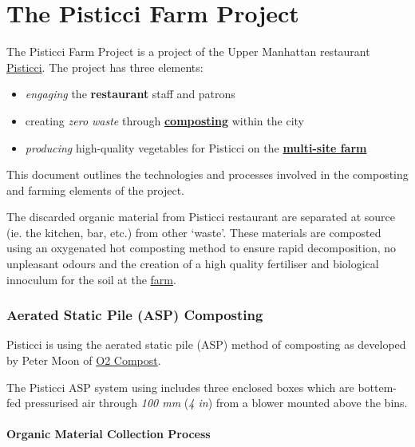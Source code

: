 \section{The Pisticci Farm Project}\label{the-pisticci-farm-project}

The Pisticci Farm Project is a project of the Upper Manhattan restaurant
\href{http://www.pisticcinyc.com/}{Pisticci}. The project has three
elements:

\begin{itemize}
\itemsep1pt\parskip0pt
\item
  \emph{engaging} the \textbf{restaurant} staff and patrons
\item
  creating \emph{zero waste} through
  \hyperref[compost]{\textbf{composting}} within the city
\item
  \emph{producing} high-quality vegetables for Pisticci on the
  \hyperref[farm]{\textbf{multi-site farm}}
\end{itemize}

This document outlines the technologies and processes involved in the
composting and farming elements of the project.


The discarded organic material from Pisticci restaurant are separated at
source (ie. the kitchen, bar, etc.) from other `waste'. These materials
are composted using an oxygenated hot composting method to ensure rapid
decomposition, no unpleasant odours and the creation of a high quality
fertiliser and biological innoculum for the soil at the
\hyperref[farm]{farm}.

\subsubsection{Aerated Static Pile (ASP)
Composting}\label{aerated-static-pile-asp-composting}

Pisticci is using the aerated static pile (ASP) method of composting as
developed by Peter Moon of \href{http://www.o2compost.com}{O2 Compost}.

The Pisticci ASP system using includes three enclosed boxes which are
bottem-fed pressurised air through \emph{100 mm} (\emph{4 in}) from a
blower mounted above the bins.

\paragraph{Organic Material Collection
Process}\label{organic-material-collection-process}

